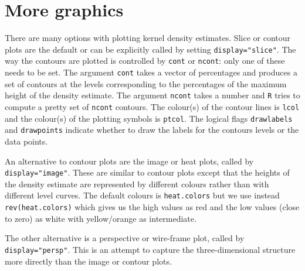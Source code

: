 \documentclass[a4paper,11pt]{article}
\begin{document}

\section{More graphics}
There are many options with plotting kernel density estimates. 
Slice or contour plots are the default or can be explicitly called by setting
\texttt{display="slice"}. The way the contours are plotted is controlled by
\texttt{cont} or \texttt{ncont}: only one of these needs to be set. 
The argument 
\texttt{cont} takes a vector of percentages and produces a set of contours
at the levels corresponding to the percentages of the maximum height of the 
density estimate. The argument 
\texttt{ncont} takes a number and \texttt{R} tries to 
compute a pretty set of \texttt{ncont} contours.  
The colour(s) of the contour lines is \texttt{lcol} and
the colour(s) of the plotting symbols is \texttt{ptcol}.
The logical flags \texttt{drawlabels} and \texttt{drawpoints} indicate
whether to draw the labels for the contours levels or the data points.

An alternative to contour plots are the image or heat plots,
called by \texttt{display="image"}.  These 
are similar to contour plots except that the heights of the density 
estimate are represented by different colours rather than with
different level curves. The default colours is \texttt{heat.colors}
but we use instead \texttt{rev(heat.colors)} which gives us the high 
values as red and the low values (close to zero) as white with
yellow/orange as intermediate. 

The other alternative is a perspective or wire-frame plot, 
called by \texttt{display="persp"}. This is an attempt
to capture the three-dimensional structure more directly than the 
image or contour plots.

\end{document}
